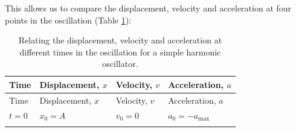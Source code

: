 \documentclass[
]{book}
\begin{document}
This allows us to compare the displacement, velocity and acceleration at four points in the oscillation (Table \ref{tab:ch1-xva-comparison1}):

\begin{longtable}[]{@{}llll@{}}
\caption{\label{tab:ch1-xva-comparison1} Relating the displacement, velocity and acceleration at different times in the oscillation for a simple harmonic oscillator.}\tabularnewline
\toprule
\begin{minipage}[b]{0.22\columnwidth}\raggedright
Time\strut
\end{minipage} & \begin{minipage}[b]{0.22\columnwidth}\raggedright
Displacement, \(x\)\strut
\end{minipage} & \begin{minipage}[b]{0.22\columnwidth}\raggedright
Velocity, \(v\)\strut
\end{minipage} & \begin{minipage}[b]{0.22\columnwidth}\raggedright
Acceleration, \(a\)\strut
\end{minipage}\tabularnewline
\midrule
\endfirsthead
\toprule
\begin{minipage}[b]{0.22\columnwidth}\raggedright
Time\strut
\end{minipage} & \begin{minipage}[b]{0.22\columnwidth}\raggedright
Displacement, \(x\)\strut
\end{minipage} & \begin{minipage}[b]{0.22\columnwidth}\raggedright
Velocity, \(v\)\strut
\end{minipage} & \begin{minipage}[b]{0.22\columnwidth}\raggedright
Acceleration, \(a\)\strut
\end{minipage}\tabularnewline
\midrule
\endhead
\begin{minipage}[t]{0.22\columnwidth}\raggedright
\(t = 0\)\strut
\end{minipage} & \begin{minipage}[t]{0.22\columnwidth}\raggedright
\(x_0 = A\)\strut
\end{minipage} & \begin{minipage}[t]{0.22\columnwidth}\raggedright
\(v_0 = 0\)\strut
\end{minipage} & \begin{minipage}[t]{0.22\columnwidth}\raggedright
\(a_0 = -a_{\textrm{max}}\)\strut
\end{minipage}\tabularnewline
\begin{minipage}[t]{0.22\columnwidth}\raggedright

\end{minipage}
\end{longtable}
\end{document}
